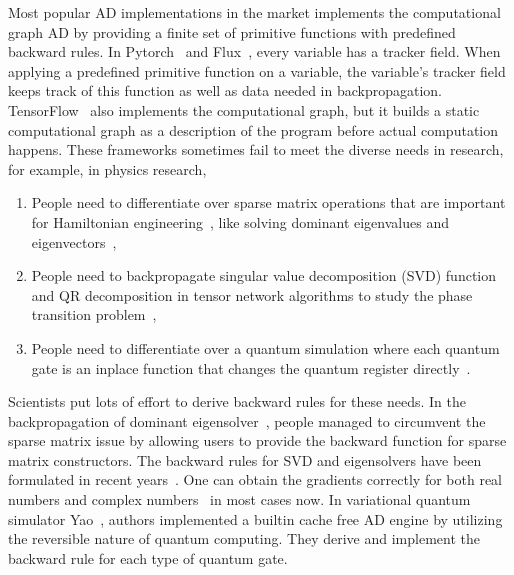 \documentclass{article}
\newcommand{\<}{\langle}
\renewcommand{\>}{\rangle}
\theoremstyle{definition}\newtheorem{definition}{\textit{Definition}}
\begin{document}
    Most popular AD implementations in the market implements the computational graph AD by providing a finite set of primitive functions with predefined backward rules.
    In Pytorch~\cite{Paszke2017} and Flux~\cite{Innes2018a}, every variable has a tracker field. When applying a predefined primitive function on a variable, the variable's tracker field keeps track of this function as well as data needed in backpropagation. TensorFlow~\cite{Tensorflow2015} also implements the computational graph, but it builds a static computational graph as a description of the program before actual computation happens.
    These frameworks sometimes fail to meet the diverse needs in research, for example, in physics research,
    \begin{enumerate}
        \item People need to differentiate over sparse matrix operations that are important for Hamiltonian engineering~\cite{Xie2020}, like solving dominant eigenvalues and eigenvectors~\cite{Golub2012},
        \item People need to backpropagate singular value decomposition (SVD) function and QR decomposition in tensor network algorithms to study the phase transition problem~\cite{Golub2012, Liao2019},
        \item People need to differentiate over a quantum simulation where each quantum gate is an inplace function that changes the quantum register directly~\cite{Luo2019}.
    \end{enumerate}
    Scientists put lots of effort to derive backward rules for these needs. In the backpropagation of dominant eigensolver~\cite{Xie2020}, people managed to circumvent the sparse matrix issue by allowing users to provide the backward function for sparse matrix constructors.
    The backward rules for SVD and eigensolvers have been formulated in recent years~\cite{Seeger2017,Wan2019,Hubig2019}. One can obtain the gradients correctly for both real numbers and complex numbers~\cite{Wan2019} in most cases now.
    In variational quantum simulator Yao~\cite{Luo2019}, authors implemented a builtin cache free AD engine by utilizing the reversible nature of quantum computing. They derive and implement the backward rule for each type of quantum gate.
\end{document}

